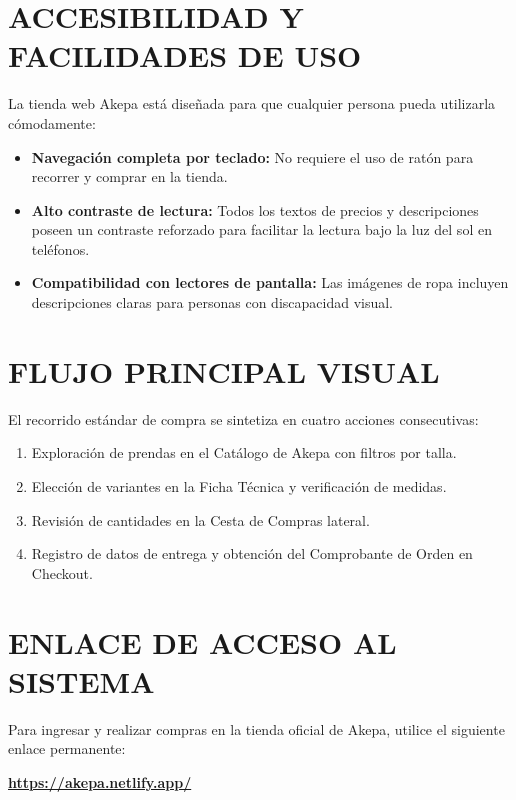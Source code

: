 \documentclass[12pt]{article}
\begin{document}
\section*{ACCESIBILIDAD Y FACILIDADES DE USO}
La tienda web Akepa está diseñada para que cualquier persona pueda utilizarla cómodamente:
\begin{itemize}
    \item \textbf{Navegación completa por teclado:} No requiere el uso de ratón para recorrer y comprar en la tienda.
    \item \textbf{Alto contraste de lectura:} Todos los textos de precios y descripciones poseen un contraste reforzado para facilitar la lectura bajo la luz del sol en teléfonos.
    \item \textbf{Compatibilidad con lectores de pantalla:} Las imágenes de ropa incluyen descripciones claras para personas con discapacidad visual.
\end{itemize}

\section*{FLUJO PRINCIPAL VISUAL}
El recorrido estándar de compra se sintetiza en cuatro acciones consecutivas:
\begin{enumerate}
    \item Exploración de prendas en el Catálogo de Akepa con filtros por talla.
    \item Elección de variantes en la Ficha Técnica y verificación de medidas.
    \item Revisión de cantidades en la Cesta de Compras lateral.
    \item Registro de datos de entrega y obtención del Comprobante de Orden en Checkout.
\end{enumerate}

\section*{ENLACE DE ACCESO AL SISTEMA}
Para ingresar y realizar compras en la tienda oficial de Akepa, utilice el siguiente enlace permanente:
\begin{center}
    \textbf{\href{https://akepa.netlify.app/}{https://akepa.netlify.app/}}
\end{center}
\end{document}
